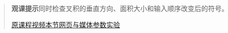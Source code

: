 \begin{quote}\small\textbf{观课提示}\quad 同时检查叉积的垂直方向、面积大小和输入顺序改变后的符号。

\href{https://www.youtube.com/watch?v=eu6i7WJeinw}{原课程视频}\quad\href{https://vitael04213.github.io/3blue1brown-notes/lessons/cross-products.html}{本节网页与媒体}\quad\href{https://vitael04213.github.io/3blue1brown-notes/lab.html\#spatial}{参数实验}
\end{quote}
